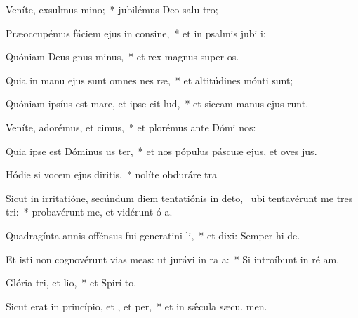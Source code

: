 \item Veníte, exsulmus mino;~* jubilémus Deo salu tro;
\item Præoccupémus fáciem ejus in consine,~* et in psalmis jubi i:
\item Quóniam Deus gnus minus,~* et rex magnus super  os.
\item Quia in manu ejus sunt omnes nes ræ,~* et altitúdines mónti  sunt;
\item Quóniam ipsíus est mare, et ipse cit lud,~* et siccam manus ejus runt.
\item Veníte, adorémus, et cimus,~* et plorémus ante Dómi   nos:
\item Quia ipse est Dóminus us ter,~* et nos pópulus páscuæ ejus, et oves  jus.
\item Hódie si vocem ejus diritis,~* nolíte obduráre  tra
\item Sicut in irritatióne, secúndum diem tentatiónis in deto,~\pscross{} ubi tentavérunt me tres tri:~* probavérunt me, et vidérunt ó a.
\item Quadragínta annis offénsus fui generatini li,~* et dixi: Semper hi  de.
\item Et isti non cognovérunt vias meas: ut jurávi in ra a:~* Si introíbunt in ré am.
\item Glória tri, et lio,~* et Spirí to.
\item Sicut erat in princípio, et , et per,~* et in sǽcula sæcu. men.
